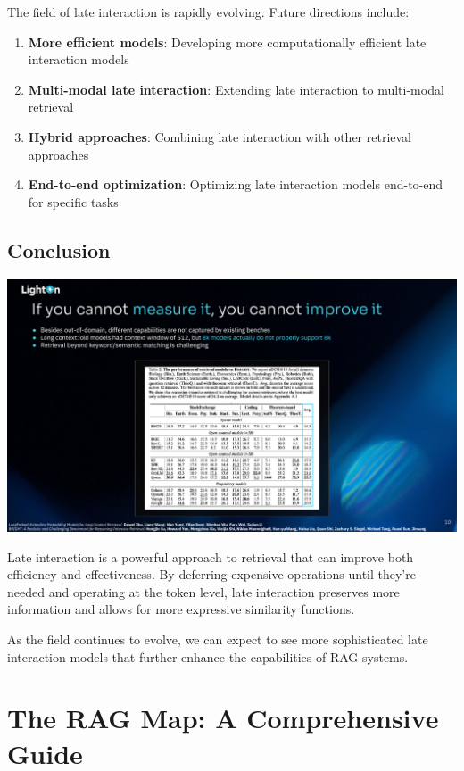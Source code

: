 \documentclass[
  letterpaper,
  oneside]{scrbook}
\providecommand{\tightlist}{%
  \setlength{\itemsep}{0pt}\setlength{\parskip}{0pt}}\usepackage{longtable,booktabs,array}
\begin{document}
The field of late interaction is rapidly evolving. Future directions
include:

\begin{enumerate}
\def\labelenumi{\arabic{enumi}.}
\tightlist
\item
  \textbf{More efficient models}: Developing more computationally
  efficient late interaction models
\item
  \textbf{Multi-modal late interaction}: Extending late interaction to
  multi-modal retrieval
\item
  \textbf{Hybrid approaches}: Combining late interaction with other
  retrieval approaches
\item
  \textbf{End-to-end optimization}: Optimizing late interaction models
  end-to-end for specific tasks
\end{enumerate}

\section{Conclusion}\label{conclusion-3}

\includegraphics{chapters/../p4-images/slide_10.png}

Late interaction is a powerful approach to retrieval that can improve
both efficiency and effectiveness. By deferring expensive operations
until they're needed and operating at the token level, late interaction
preserves more information and allows for more expressive similarity
functions.

As the field continues to evolve, we can expect to see more
sophisticated late interaction models that further enhance the
capabilities of RAG systems.

\chapter{The RAG Map: A Comprehensive
Guide}\label{the-rag-map-a-comprehensive-guide}
\end{document}

